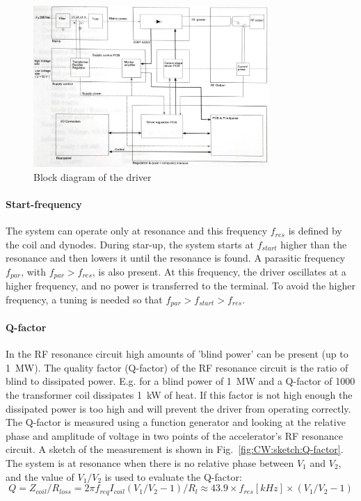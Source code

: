 \begin{refsection}
        \begin{figure}
            \centering
            \includegraphics[width=0.8\textwidth]{Figures/MEG/CW/cw_circuit_driver.jpeg}
            \caption[CW: driver]{Block diagram of the driver}
            \label{fig:CW:circuit:driver}
        \end{figure}

        \paragraph{Start-frequency}
        The system can operate only at resonance and this frequency $f_{res}$ is defined by the coil and dynodes.
        During star-up, the system starts at $f_{start}$ higher than the resonance and then lowers it until the resonance is found.
        A parasitic frequency $f_{par}$, with $f_{par}>f_{res}$, is also present. 
        At this frequency, the driver oscillates at a higher frequency, and no power is transferred to the terminal.
        To avoid the higher frequency, a tuning is needed so that $f_{par}>f_{start}>f_{res}$.

        
        \paragraph{Q-factor} In the RF resonance circuit high amounts of 'blind power' can be present (up to \SI{1}{MW}).
        The quality factor (Q-factor) of the RF resonance circuit is the ratio of blind to dissipated power.
        E.g. for a blind power of \SI{1}{MW} and a Q-factor of 1000 the transformer coil dissipates \SI{1}{kW} of heat.
        If this factor is not high enough the dissipated power is too high and will prevent the driver from operating correctly.
        The Q-factor is measured using a function generator and looking at the relative phase and amplitude of voltage in two points of the accelerator's RF resonance circuit.
        A sketch of the measurement is shown in Fig.~\ref{fig:CW:sketch:Q-factor}.
        The system is at resonance when there is no relative phase between $V_1$ and $V_2$, and the value of $V_1/V_2$ is used to evaluate the Q-factor: 
        \begin{equation}
            Q = Z_{coil}/R_{loss} = 2\pi f_{req} I_{coil} (V_1/V_2-1)/R_l \approx 43.9\times f_{res}[kHz]\times(V_1/V_2-1)
            \label{eq:cw:qfactor}
        \end{equation}



\end{refsection}
